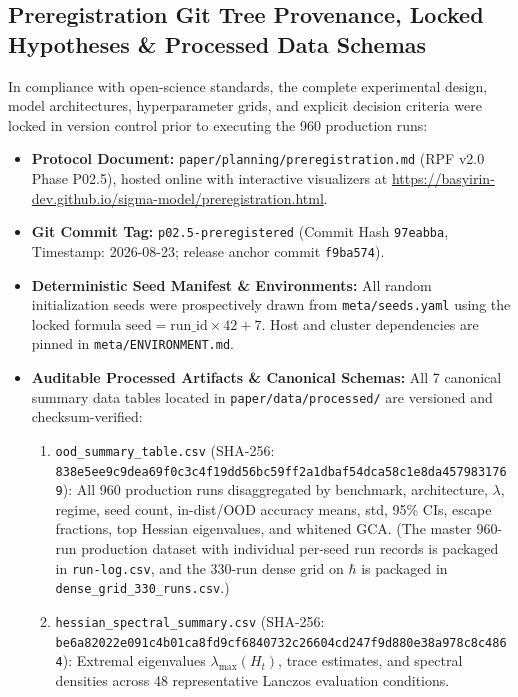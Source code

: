 \documentclass{article}
\theoremstyle{plain}
\theoremstyle{definition}
\begin{document}
\subsection{Preregistration Git Tree Provenance, Locked Hypotheses \& Processed Data Schemas}
\label{sec:app_preregistration_provenance}
In compliance with open-science standards, the complete experimental design, model architectures, hyperparameter grids, and explicit decision criteria were locked in version control prior to executing the 960 production runs:
\begin{itemize}[leftmargin=*,noitemsep]
    \item \textbf{Protocol Document:} \texttt{paper/planning/preregistration.md} (RPF v2.0 Phase P02.5), hosted online with interactive visualizers at \url{https://basyirin-dev.github.io/sigma-model/preregistration.html}.
    \item \textbf{Git Commit Tag:} \texttt{p02.5-preregistered} (Commit Hash \texttt{97eabba}, Timestamp: 2026-08-23; release anchor commit \texttt{f9ba574}).
    \item \textbf{Deterministic Seed Manifest \& Environments:} All random initialization seeds were prospectively drawn from \texttt{meta/seeds.yaml} using the locked formula $\text{seed} = \text{run\_id} \times 42 + 7$. Host and cluster dependencies are pinned in \texttt{meta/ENVIRONMENT.md}.
    \item \textbf{Auditable Processed Artifacts \& Canonical Schemas:} All 7 canonical summary data tables located in \texttt{paper/data/processed/} are versioned and checksum-verified:
    \begin{enumerate}[label=(\alph*),noitemsep]
        \item \texttt{ood\_summary\_table.csv} (SHA-256: \texttt{838e5ee9c9dea69f0c3c4f19dd56bc59ff2a1dbaf54dca58c1e8da4579831769}): All 960 production runs disaggregated by benchmark, architecture, $\lambda$, regime, seed count, in-dist/OOD accuracy means, std, 95\% CIs, escape fractions, top Hessian eigenvalues, and whitened GCA. (The master 960-run production dataset with individual per-seed run records is packaged in \texttt{run-log.csv}, and the 330-run dense grid on $\hbar$ is packaged in \texttt{dense\_grid\_330\_runs.csv}.)
        \item \texttt{hessian\_spectral\_summary.csv} (SHA-256: \texttt{be6a82022e091c4b01ca8fd9cf6840732c26604cd247f9d880e38a978c8c4864}): Extremal eigenvalues $\lambda_{\text{max}}(H_t)$, trace estimates, and spectral densities across 48 representative Lanczos evaluation conditions.

\end{enumerate}
\end{itemize}
\end{document}
